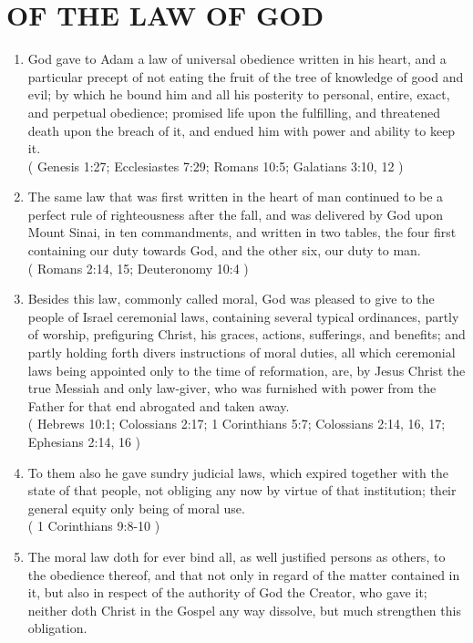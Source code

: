 \documentclass[12pt,a4paper]{book}
\begin{document}
\chapter{OF THE LAW OF GOD}
\label{ch-law-god}
\begin{enumerate}
\item God gave to Adam a law of universal obedience written in his heart, and a particular precept of not eating the fruit of the tree of knowledge of good and evil; by which he bound him and all his posterity to personal, entire, exact, and perpetual obedience; promised life upon the fulfilling, and threatened death upon the breach of it, and endued him with power and ability to keep it.\\
( Genesis 1:27; Ecclesiastes 7:29; Romans 10:5; Galatians 3:10, 12 )
\item The same law that was first written in the heart of man continued to be a perfect rule of righteousness after the fall, and was delivered by God upon Mount Sinai, in ten commandments, and written in two tables, the four first containing our duty towards God, and the other six, our duty to man.\\
( Romans 2:14, 15; Deuteronomy 10:4 )
\item Besides this law, commonly called moral, God was pleased to give to the people of Israel ceremonial laws, containing several typical ordinances, partly of worship, prefiguring Christ, his graces, actions, sufferings, and benefits; and partly holding forth divers instructions of moral duties, all which ceremonial laws being appointed only to the time of reformation, are, by Jesus Christ the true Messiah and only law-giver, who was furnished with power from the Father for that end abrogated and taken away.\\
( Hebrews 10:1; Colossians 2:17; 1 Corinthians 5:7; Colossians 2:14, 16, 17; Ephesians 2:14, 16 )
\item To them also he gave sundry judicial laws, which expired together with the state of that people, not obliging any now by virtue of that institution; their general equity only being of moral use.\\
( 1 Corinthians 9:8-10 )
\item The moral law doth for ever bind all, as well justified persons as others, to the obedience thereof, and that not only in regard of the matter contained in it, but also in respect of the authority of God the Creator, who gave it; neither doth Christ in the Gospel any way dissolve, but much strengthen this obligation.\\

\end{enumerate}
\end{document}
